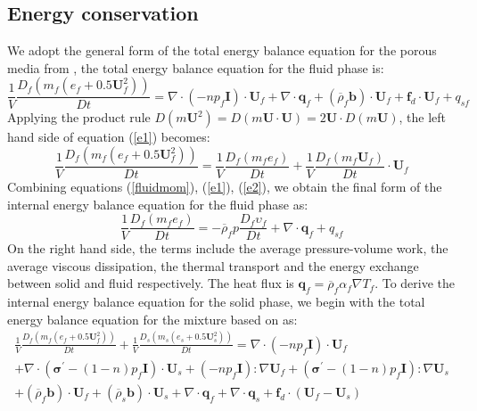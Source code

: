 \documentclass[preprint,12pt]{elsarticle}
\begin{document}
\subsection{\textsf{Energy conservation}}
We adopt the general form of the total energy balance equation for the porous media from \cite{Hassanizadeh}, the total energy balance equation for the fluid phase is:
%
%
\begin{equation}
\label{e1}
     \frac{1}{V}\frac{D_f(m_f (e_f+0.5\pmb{U}_f^2))}{Dt} = \nabla \cdot (-np_f\pmb{I}) \cdot \pmb{U}_f + \nabla \cdot \pmb{q}_f + (\overline{\rho}_f \pmb{b}) \cdot \pmb{U}_f + \pmb{f}_{d} \cdot \pmb{U}_f + q_{sf}
\end{equation}
%
%
Applying the product rule $D(m\pmb{U}^2)=D(m \pmb{U} \cdot \pmb{U}) = 2 \pmb{U} \cdot D(m \pmb{U})$, the left hand side of equation (\ref{e1}) becomes:\\
%
%
\begin{equation}
\label{e2}
     \frac{1}{V}\frac{D_f(m_f (e_f+0.5\pmb{U}_f^2))}{Dt} = \frac{1}{V}\frac{D_f(m_f e_f)}{Dt} + \frac{1}{V}\frac{D_f(m_f \pmb{U}_f)}{Dt} \cdot \pmb{U}_f 
\end{equation}
%
%
Combining equations (\ref{fluidmom}), (\ref{e1}), (\ref{e2}), we obtain the final form of the internal energy balance equation for the fluid phase as:
%
%
\begin{equation}
     \frac{1}{V}\frac{D_f(m_f e_f)}{Dt} = 
    -\overline{\rho}_f p  \frac{D_f\upsilon_f}{Dt} + \nabla \cdot \pmb{q}_f + q_{sf}
\end{equation}
%
%
On the right hand side, the terms include the average pressure-volume work, the average viscous dissipation, the thermal transport and the energy exchange between solid and fluid respectively. The heat flux is $\pmb{q}_f = \overline{\rho}_f \alpha_f \nabla T_f$. To derive the internal energy balance equation for the solid phase, we begin with the total energy balance equation for the mixture based on \cite{Hassanizadeh} as:\\
%
%
\begin{equation}
\label{e3}
\begin{gathered}
     \frac{1}{V}\frac{D_f(m_f (e_f+0.5\pmb{U}_f^2))}{Dt} + \frac{1}{V}\frac{D_s(m_s (e_s+0.5\pmb{U}_s^2))}{Dt} = \nabla \cdot (-np_f\pmb{I}) \cdot \pmb{U}_f \\
     + \nabla \cdot (\pmb{\sigma}^\prime-(1-n)p_f\pmb{I}) \cdot \pmb{U}_s + (-np_f\pmb{I}) : \nabla \pmb{U}_f + (\pmb{\sigma}^\prime-(1-n)p_f\pmb{I}) : \nabla \pmb{U}_s \\
     + (\overline{\rho}_f \pmb{b}) \cdot \pmb{U}_f + (\overline{\rho}_s \pmb{b}) \cdot \pmb{U}_s
     + \nabla \cdot \pmb{q}_f + \nabla \cdot \pmb{q}_s + \pmb{f}_{d} \cdot (\pmb{U}_f - \pmb{U}_s)  
\end{gathered}
\end{equation}
\end{document}
